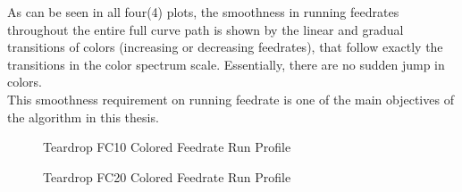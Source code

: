 As can be seen in all four(4) plots, the smoothness in running feedrates throughout the entire full curve path is shown by the linear and gradual transitions of colors (increasing or decreasing feedrates), that follow exactly the transitions in the color spectrum scale. Essentially, there are no sudden jump in colors. \\  

This smoothness requirement on running feedrate is one of the main objectives of the algorithm in this thesis.

\clearpage
\pagebreak 

\begin{figure}
	\caption  {Teardrop FC10 Colored Feedrate Run Profile}
	\label{img-chap4-Teardrop FC10 Colored Feedrate Run Profile}
\end{figure}	

\begin{figure}
	\caption  {Teardrop FC20 Colored Feedrate Run Profile}
	\label{img-chap4-Teardrop FC20 Colored Feedrate Run Profile}
\end{figure}	

